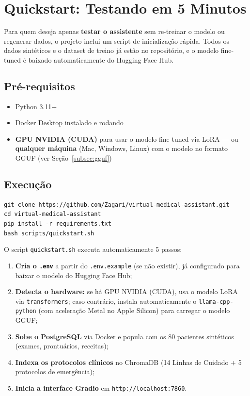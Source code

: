 \section{Quickstart: Testando em 5 Minutos}\label{sec:quickstart}

Para quem deseja apenas \textbf{testar o assistente} sem re-treinar o modelo ou regenerar dados, o projeto inclui um script de inicialização rápida. Todos os dados sintéticos e o dataset de treino já estão no repositório, e o modelo fine-tuned é baixado automaticamente do Hugging Face Hub.

\subsection{Pré-requisitos}

\begin{itemize}
    \item Python 3.11+
    \item Docker Desktop instalado e rodando
    \item \textbf{GPU NVIDIA (CUDA)} para usar o modelo fine-tuned via LoRA --- ou \textbf{qualquer máquina} (Mac, Windows, Linux) com o modelo no formato GGUF (ver Seção~\ref{subsec:gguf})
\end{itemize}

\subsection{Execução}

\begin{lstlisting}[style=bash, caption={Quickstart: do clone ao assistente funcionando.}]
git clone https://github.com/Zagari/virtual-medical-assistant.git
cd virtual-medical-assistant
pip install -r requirements.txt
bash scripts/quickstart.sh
\end{lstlisting}

O script \texttt{quickstart.sh} executa automaticamente 5 passos:

\begin{enumerate}
    \item \textbf{Cria o \texttt{.env}} a partir do \texttt{.env.example} (se não existir), já configurado para baixar o modelo do Hugging Face Hub;
    \item \textbf{Detecta o hardware:} se há GPU NVIDIA (CUDA), usa o modelo LoRA via \texttt{transformers}; caso contrário, instala automaticamente o \texttt{llama-cpp-python} (com aceleração Metal no Apple Silicon) para carregar o modelo GGUF;
    \item \textbf{Sobe o PostgreSQL} via Docker e popula com os 80 pacientes sintéticos (exames, prontuários, receitas);
    \item \textbf{Indexa os protocolos clínicos} no ChromaDB (14 Linhas de Cuidado + 5 protocolos de emergência);
    \item \textbf{Inicia a interface Gradio} em \texttt{http://localhost:7860}.
\end{enumerate}

